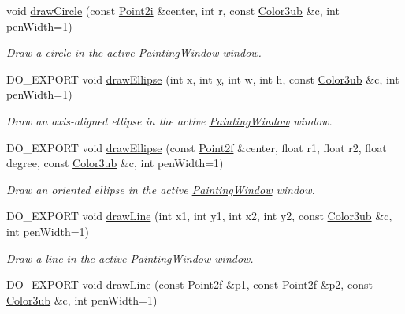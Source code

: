 \begin{DoxyCompactItemize}
void \hyperlink{group___draw2_d_ga0dcd2c6ad80005cf9fc3e92198fc508f}{draw\-Circle} (const \hyperlink{group___eigen_typedefs_ga048a27763e58f682b1b91af86144f701}{Point2i} \&center, int r, const \hyperlink{group___color_types_ga018b76cd00a4f9dca7dd06246d5bd3aa}{Color3ub} \&c, int pen\-Width=1)
\begin{DoxyCompactList}\small\item\em Draw a circle in the active \hyperlink{class_d_o_1_1_painting_window}{Painting\-Window} window. \end{DoxyCompactList}\item 
D\-O\-\_\-\-E\-X\-P\-O\-R\-T void \hyperlink{group___draw2_d_ga7f9dee248b78883c0948e13612831835}{draw\-Ellipse} (int x, int \hyperlink{group___channel_accessors_gac90c52c5b3a7b2a7e3761e6e84f25778}{y}, int w, int h, const \hyperlink{group___color_types_ga018b76cd00a4f9dca7dd06246d5bd3aa}{Color3ub} \&c, int pen\-Width=1)
\begin{DoxyCompactList}\small\item\em Draw an axis-\/aligned ellipse in the active \hyperlink{class_d_o_1_1_painting_window}{Painting\-Window} window. \end{DoxyCompactList}\item 
D\-O\-\_\-\-E\-X\-P\-O\-R\-T void \hyperlink{group___draw2_d_gad48ba1e8253e2f9308cc1b6c4c3eec22}{draw\-Ellipse} (const \hyperlink{group___eigen_typedefs_ga02df8c02295a7722cc3f5b89e8137464}{Point2f} \&center, float r1, float r2, float degree, const \hyperlink{group___color_types_ga018b76cd00a4f9dca7dd06246d5bd3aa}{Color3ub} \&c, int pen\-Width=1)
\begin{DoxyCompactList}\small\item\em Draw an oriented ellipse in the active \hyperlink{class_d_o_1_1_painting_window}{Painting\-Window} window. \end{DoxyCompactList}\item 
D\-O\-\_\-\-E\-X\-P\-O\-R\-T void \hyperlink{group___draw2_d_ga768901f98aa242de772e32e0aaad4bd1}{draw\-Line} (int x1, int y1, int x2, int y2, const \hyperlink{group___color_types_ga018b76cd00a4f9dca7dd06246d5bd3aa}{Color3ub} \&c, int pen\-Width=1)
\begin{DoxyCompactList}\small\item\em Draw a line in the active \hyperlink{class_d_o_1_1_painting_window}{Painting\-Window} window. \end{DoxyCompactList}\item 
D\-O\-\_\-\-E\-X\-P\-O\-R\-T void \hyperlink{group___draw2_d_gab6fedda279868c00c6e6b905cfabf6ba}{draw\-Line} (const \hyperlink{group___eigen_typedefs_ga02df8c02295a7722cc3f5b89e8137464}{Point2f} \&p1, const \hyperlink{group___eigen_typedefs_ga02df8c02295a7722cc3f5b89e8137464}{Point2f} \&p2, const \hyperlink{group___color_types_ga018b76cd00a4f9dca7dd06246d5bd3aa}{Color3ub} \&c, int pen\-Width=1)

\end{DoxyCompactItemize}
